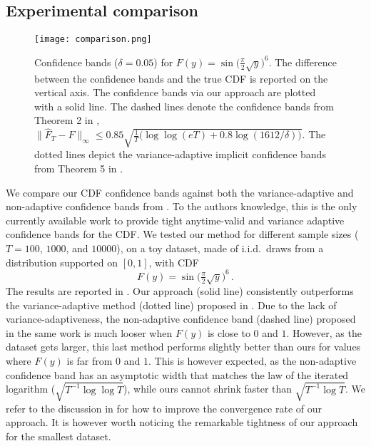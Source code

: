 \documentclass[3p, authoryear, 10pt]{elsarticle}%
\begin{document}
\subsection*{Experimental comparison}\label{sec:toy}
\begin{figure}[t!]
    \centering
    \texttt{[image: comparison.png]}
    \caption{Confidence bands ($\delta=0.05$) for $F(y) = \sin\big(\frac\pi2\sqrt y\big)^6$. The difference between the confidence bands and the true CDF is reported on the vertical axis. The confidence bands via our approach are plotted with a solid line. The dashed lines denote the confidence bands from Theorem 2 in \cite{howard2022sequential}, $\|\hat F_T-F\|_\infty \leq 0.85\sqrt{\tfrac1T\big(\log\log(eT) + 0.8\log(1612/\delta)\big)}$. The dotted lines depict the variance-adaptive implicit confidence bands from Theorem 5 in \cite{howard2022sequential}.}
    \label{fig:comparison}
\end{figure}
We compare our CDF confidence bands against both the variance-adaptive and non-adaptive confidence bands from \citep{howard2022sequential}. To the authors knowledge, this is the only currently available work to provide tight anytime-valid and variance adaptive confidence bands for the CDF. We tested our method for different sample sizes ($T=100$, $1000$, and $10000$), on a toy dataset, made of i.i.d.\ draws from a distribution supported on $[0,1]$, with CDF $$F(y) = \sin\big(\tfrac\pi2\sqrt y\big)^6\,.$$ The results are reported in . Our approach (solid line) consistently outperforms the variance-adaptive method (dotted line) proposed in \cite{howard2022sequential}. Due to the lack of variance-adaptiveness, the non-adaptive confidence band (dashed line) proposed in the same work is much looser when $F(y)$ is close to $0$ and $1$. However, as the dataset gets larger, this last method performs slightly better than ours for values where $F(y)$ is far from $0$ and $1$. This is however expected, as the non-adaptive confidence band has an asymptotic width that matches the law of the iterated logarithm ($\sqrt{T^{-1}\log\log T}$), while ours cannot shrink faster than $\sqrt{T^{-1}\log T}$. We refer to the discussion in  for how to improve the convergence rate of our approach. It is however worth noticing the remarkable tightness of our approach for the smallest dataset.
\end{document}

